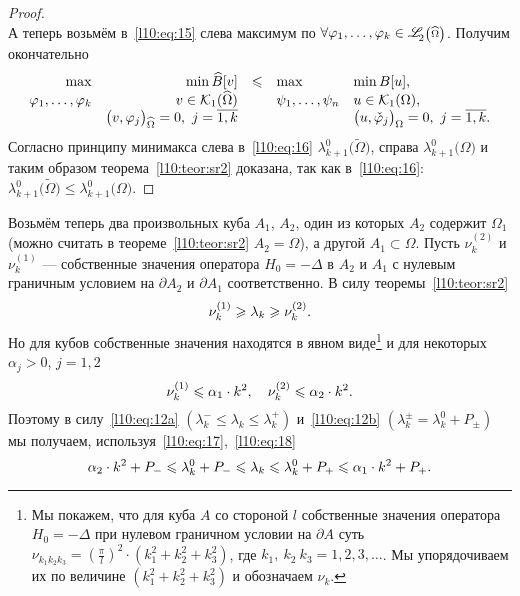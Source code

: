 \documentclass[12pt,a4paper,openany,fleqn]{book}
\newcommand{\mc}[1]{\ensuremath{\mathcal{#1}}}
\newcommand{\K}{\mc{K}}
\newcommand{\fLr}[1][{[a,b];\rho}]{\ensuremath{\mathscr{L}\hspace*{-0.11 cm}{\mathstrut}_{2}{\scriptstyle\left(\vphantom{A^b}#1\right)}}}
\theoremstyle{definition}
\begin{document}
\begin{proof}
\begin{equation}
		\end{equation}
		А теперь возьмём в~\eqref{l10:eq:15} слева максимум по $\forall\phi_1,\ldots,\phi_k\in\fLr[\widehat{\Omega}]$. Получим окончательно
		\begin{equation}\label{l10:eq:16}
		\hfill\begin{array}{rrcll}
			\max&\min\widehat{B}[v]&\leqslant&\max&\min B[u],\\
			\phi_1,\ldots,\phi_k&v\in\K_1(\widehat{\Omega})&  &\psi_1,\ldots,\psi_n &u\in\K_1(\Omega),\\
			&\big(v,\phi_j\big)_{\widehat{\Omega}}=0,\ j=\overline{1,k} & &  &\big(u,\check{\phi}_j\big)_{\Omega}=0,\ j=\overline{1,k}.
		\end{array}\hfill
	\end{equation}	
	Согласно принципу минимакса слева в~\eqref{l10:eq:16} $\lambda_{k+1}^0\big(\widetilde{\Omega}\big)$, справа $\lambda_{k+1}^0\big(\Omega\big)$ и таким образом теорема~\ref{l10:teor:sr2} доказана, так как в~\eqref{l10:eq:16}: $\lambda_{k+1}^0\big(\widetilde{\Omega}\big)\leqslant\lambda_{k+1}^0\big(\Omega\big)$.  
	\end{proof}
	
	Возьмём теперь два произвольных куба $A_1$, $A_2$, один из которых $A_2$ содержит $\Omega_1$ (можно считать в теореме~\ref{l10:teor:sr2} $A_2=\widehat{\Omega}$), а другой $A_1\subset\Omega$. Пусть $\nu_k^{(2)}$ и $\nu_k^{(1)}$ --- собственные значения оператора $H_0=-\Delta$ в $A_2$ и $A_1$ с нулевым граничным условием на $\partial A_2$ и $\partial A_1$ соответственно. В силу теоремы~\ref{l10:teor:sr2} 
	\begin{equation}\label{l10:eq:17}
		\hfill\nu_k^{(1)}\geqslant\lambda_k\geqslant\nu_k^{(2)}.\hfill	
	\end{equation}
	Но для кубов собственные значения находятся в явном виде\footnote{Мы покажем, что для куба $A$ со стороной $l$ собственные значения оператора $H_0=-\Delta$ при нулевом граничном условии на $\partial A$ суть $\displaystyle\nu_{k_1 k_2 k_3}=\left(\frac{\pi}{l}\right)^2\cdot\left(k_1^2+k_2^2+k_3^2\right)$, где $k_1,\ k_2\ k_3=1,2,3,\ldots$. Мы упорядочиваем их по величине $\left(k_1^2+k_2^2+k_3^2\right)$ и обозначаем $\nu_k$.} и для некоторых $\alpha_j>0$, $j=1,2$
	\begin{equation}\label{l10:eq:18}
		\hfill\nu_k^{(1)}\leqslant\alpha_1\cdot k^2,\quad\nu_k^{(2)}\leqslant\alpha_2\cdot k^2.\hfill
	\end{equation}
	Поэтому в силу~\eqref{l10:eq:12a} $\displaystyle\left(\lambda_k^{-}\leqslant\lambda_k\leqslant\lambda_k^{+}\right)$  и~\eqref{l10:eq:12b} $\displaystyle\left(\lambda_k^{\pm}=\lambda_k^0+P_{\pm}\right)$ мы получаем, используя~\eqref{l10:eq:17},~\eqref{l10:eq:18} 
	\begin{equation*}
		\hfill\alpha_2\cdot k^2+P_{-}\leqslant\lambda_k^{0}+P_{-}\leqslant\lambda_k\leqslant\lambda_k^{0}+P_{+}\leqslant\alpha_1\cdot k^2+P_{+}.\hfill
	\end{equation*}
\end{document}

